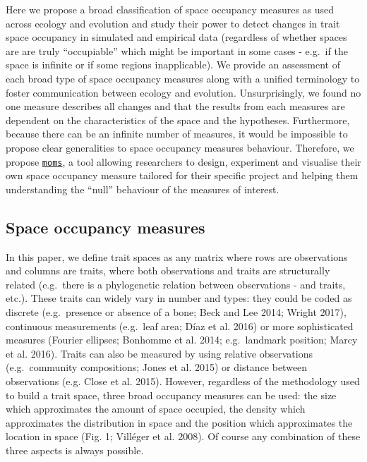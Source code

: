 \documentclass[]{article}
\begin{document}
Here we propose a broad classification of space occupancy measures as
used across ecology and evolution and study their power to detect
changes in trait space occupancy in simulated and empirical data
(regardless of whether spaces are are truly ``occupiable'' which might
be important in some cases - e.g.~if the space is infinite or if some
regions inapplicable). We provide an assessment of each broad type of
space occupancy measures along with a unified terminology to foster
communication between ecology and evolution. Unsurprisingly, we found no
one measure describes all changes and that the results from each
measures are dependent on the characteristics of the space and the
hypotheses. Furthermore, because there can be an infinite number of
measures, it would be impossible to propose clear generalities to space
occupancy measures behaviour. Therefore, we propose
\href{https://tguillerme.shinyapps.io/moms/}{\texttt{moms}}, a tool
allowing researchers to design, experiment and visualise their own space
occupancy measure tailored for their specific project and helping them
understanding the ``null'' behaviour of the measures of interest.

\subsection{Space occupancy measures}\label{space-occupancy-measures}

In this paper, we define trait spaces as any matrix where rows are
observations and columns are traits, where both observations and traits
are structurally related (e.g.~there is a phylogenetic relation between
observations - and traits, etc.). These traits can widely vary in number
and types: they could be coded as discrete (e.g.~presence or absence of
a bone; Beck and Lee 2014; Wright 2017), continuous measurements
(e.g.~leaf area; Díaz et al. 2016) or more sophisticated measures
(Fourier ellipses; Bonhomme et al. 2014; e.g.~landmark position; Marcy
et al. 2016). Traits can also be measured by using relative observations
(e.g.~community compositions; Jones et al. 2015) or distance between
observations (e.g. Close et al. 2015). However, regardless of the
methodology used to build a trait space, three broad occupancy measures
can be used: the size which approximates the amount of space occupied,
the density which approximates the distribution in space and the
position which approximates the location in space (Fig. 1; Villéger et
al. 2008). Of course any combination of these three aspects is always
possible.
\end{document}
